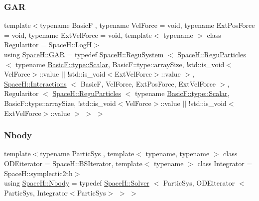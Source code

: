 \mbox{\label{namespace_space_h_aef202602b44977a819cbb122be45493e}} 
\subsubsection{\texorpdfstring{G\+AR}{GAR}}
{\footnotesize\ttfamily template$<$typename BasicF , typename Vel\+Force  = void, typename Ext\+Pos\+Force  = void, typename Ext\+Vel\+Force  = void, template$<$ typename $>$ class Regularitor = Space\+H\+::\+LogH$>$ \\
using \mbox{\hyperlink{namespace_space_h_aef202602b44977a819cbb122be45493e}{Space\+H\+::\+G\+AR}} = typedef \mbox{\hyperlink{class_space_h_1_1_regu_system}{Space\+H\+::\+Regu\+System}} $<$ \mbox{\hyperlink{class_space_h_1_1_regu_particles}{Space\+H\+::\+Regu\+Particles}} $<$ typename \mbox{\hyperlink{test_orbit_8cpp_a8c2981f3f834be9448a6ab06c28748eb}{Basic\+F\+::type\+::\+Scalar}}, Basic\+F\+::type\+::array\+Size, !std\+::is\+\_\+void$<$Vel\+Force$>$\+::value $\vert$$\vert$ !std\+::is\+\_\+void$<$Ext\+Vel\+Force$>$\+::value $>$, \mbox{\hyperlink{class_space_h_1_1_interactions}{Space\+H\+::\+Interactions}} $<$ BasicF, Vel\+Force, Ext\+Pos\+Force, Ext\+Vel\+Force $>$, Regularitor $<$ \mbox{\hyperlink{class_space_h_1_1_regu_particles}{Space\+H\+::\+Regu\+Particles}} $<$ typename \mbox{\hyperlink{test_orbit_8cpp_a8c2981f3f834be9448a6ab06c28748eb}{Basic\+F\+::type\+::\+Scalar}}, Basic\+F\+::type\+::array\+Size, !std\+::is\+\_\+void$<$Vel\+Force$>$\+::value $\vert$$\vert$ !std\+::is\+\_\+void$<$Ext\+Vel\+Force$>$\+::value $>$ $>$ $>$}

\mbox{\label{namespace_space_h_a5c39e7434c2e77ea66e868463e99dcbc}} 
\subsubsection{\texorpdfstring{Nbody}{Nbody}}
{\footnotesize\ttfamily template$<$typename Partic\+Sys , template$<$ typename, typename $>$ class O\+D\+Eiterator = Space\+H\+::\+B\+S\+Iterator, template$<$ typename $>$ class Integrator = Space\+H\+::symplectic2th$>$ \\
using \mbox{\hyperlink{namespace_space_h_a5c39e7434c2e77ea66e868463e99dcbc}{Space\+H\+::\+Nbody}} = typedef \mbox{\hyperlink{class_space_h_1_1_solver}{Space\+H\+::\+Solver}} $<$ Partic\+Sys, O\+D\+Eiterator $<$ Partic\+Sys, Integrator$<$Partic\+Sys$>$ $>$ $>$}



